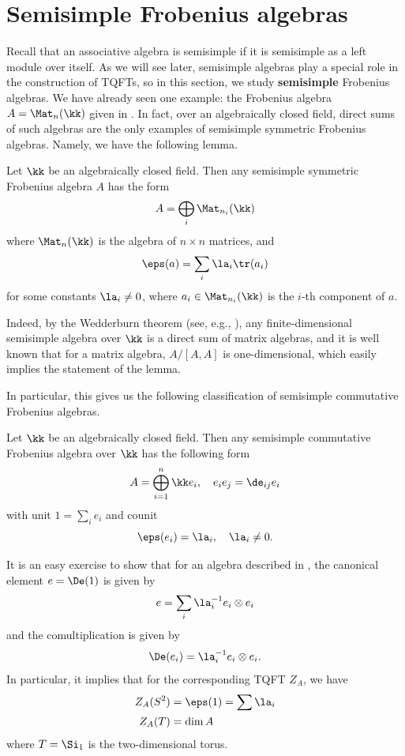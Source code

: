 \section{Semisimple Frobenius algebras}\label{s:frobenius-ss}

Recall that an associative algebra is semisimple if it is semisimple
as a left module over itself. As we will see later, semisimple
algebras play a special role in the
construction of TQFTs, so in this section, we study \textbf{semisimple}
Frobenius algebras. We have already seen one example: the Frobenius algebra
$A=\Mat_n(\kk)$ given in . In fact, over an algebraically
closed field, direct sums of such algebras are the only examples of semisimple
symmetric Frobenius algebras. Namely, we have the following lemma.

\begin{lemma}\label{l:frobenius-ss}
  Let $\kk$ be an algebraically closed field.
  Then any semisimple symmetric Frobenius algebra $A$ has the form
  $$
    A=\bigoplus_i \Mat_{n_i}(\kk)
  $$
  where $\Mat_n(\kk)$ is the algebra of $n\times n$ matrices, and
  $$
  \eps(a)=\sum_i \la_i \tr(a_i)
  $$
  for some constants $\la_i\ne 0$, where $a_i\in\Mat_{n_i}(\kk)$ is the
  $i$-th component of $a$.
\end{lemma}
Indeed, by the Wedderburn theorem (see, e.g., \cite[Section 3.5]{pierce}), any
finite-dimensional semisimple algebra over $\kk$ is a direct sum of matrix
algebras, and it is well known that for a matrix algebra, $A/[A,A]$ is
one-dimensional, which easily implies the statement of the lemma.

In particular, this gives us the following classification
of semisimple commutative Frobenius algebras.

\begin{theorem}\label{t:frobenius_commutative}
  Let $\kk$ be an algebraically closed field. Then
  any semisimple commutative Frobenius algebra over $\kk$ has the following
  form
  $$
  A=\bigoplus_{i=1}^n \kk e_i, \quad e_ie_j=\de_{ij}e_i
  $$
  with unit $1=\sum_i e_i$ and counit
  $$
  \eps(e_i)=\la_i, \quad \la_i\ne 0.
  $$
\end{theorem}

It is an easy exercise to show that for an algebra described in
, the canonical element $e=\De(1)$ is given by
$$
e= \sum_i \la_i^{-1}e_i\otimes e_i
$$
and the comultiplication is given by
$$
\De(e_i)=\la_i^{-1}e_i\otimes e_i.
$$
In particular, it implies that for the corresponding TQFT $Z_A$, we have
\begin{align*}
  Z_A(S^2)&=\eps(1)=\sum \la_i\\
  Z_A(T)&=\dim A
\end{align*}
where $T=\Si_1$ is the two-dimensional torus.

